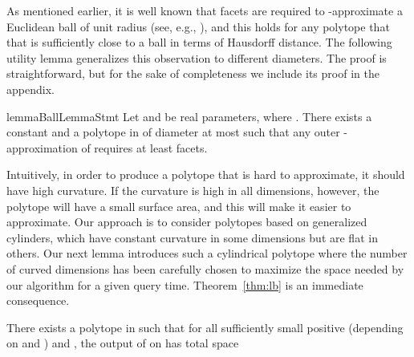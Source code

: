 \documentclass[11pt]{article}   \usepackage[letterpaper,hmargin=2.1cm,vmargin=3cm]{geometry}
\begin{document}
As mentioned earlier, it is well known that  facets are required to -approximate a Euclidean ball of unit radius (see, e.g., \cite{Bro08}), and this holds for any polytope that that is sufficiently close to a ball in terms of Hausdorff distance. The following utility lemma generalizes this observation to different diameters. The proof is straightforward, but for the sake of completeness we include its proof in the appendix.

\begin{restatable}{lemma}{BallLemmaStmt}\label{lem:ball}
Let  and  be real parameters, where . There exists a constant  and a polytope  in  of diameter at most  such that any outer -approximation of  requires at least  facets.
\end{restatable}


Intuitively, in order to produce a polytope that is hard to approximate, it should have high curvature. If the curvature is high in all dimensions, however, the polytope will have a small surface area, and this will make it easier to approximate. Our approach is to consider polytopes based on generalized cylinders, which have constant curvature in some dimensions but are flat in others. Our next lemma introduces such a cylindrical polytope where the number of curved dimensions has been carefully chosen to maximize the space needed by our algorithm for a given query time. Theorem~\ref{thm:lb} is an immediate consequence.

\begin{lemma} \label{lem:cyl}
There exists a polytope  in  such that for all sufficiently small positive  (depending on  and ) and  , the output of  on  has total space

\end{lemma}
\end{document}
